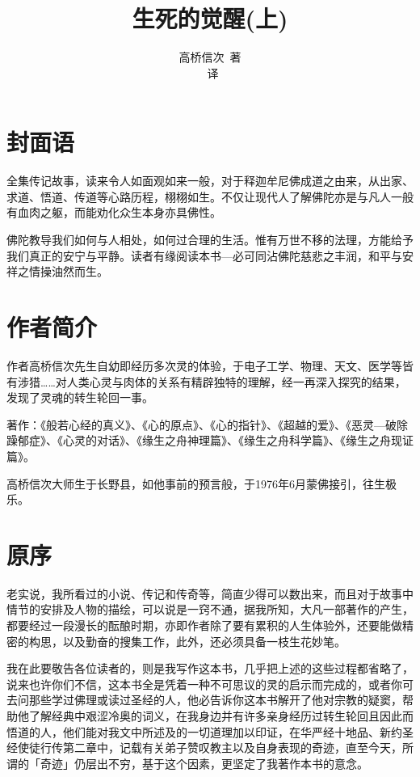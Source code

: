 \documentclass[12pt,twoside,openany]{book}
\title{生死的觉醒(上)}
\author{高桥信次\ 著\\ \xpinyin*{慰宣}\ 译}
\date{}
\begin{document}
\maketitle
\tableofcontents

\noindent
\chapter*{封面语}
全集传记故事，读来令人如面观如来一般，对于释迦牟尼佛成道之由来，从出家、求道、悟道、传道等心路历程，栩栩如生。不仅让现代人了解佛陀亦是与凡人一般有血肉之躯，而能劝化众生本身亦具佛性。

佛陀教导我们如何与人相处，如何过合理的生活。惟有万世不移的法理，方能给予我们真正的安宁与平静。读者有缘阅读本书---必可同沾佛陀慈悲之丰润，和平与安祥之情操油然而生。

\chapter*{作者简介}
作者高桥信次先生自幼即经历多次灵的体验，于电子工学、物理、天文、医学等皆有涉猎……对人类心灵与肉体的关系有精辟独特的理解，经一再深入探究的结果，发现了灵魂的转生轮回一事。

著作：《般若心经的真义》、《心的原点》、《心的指针》、《超越的爱》、《恶灵---破除躁郁症》、《心灵的对话》、《缘生之舟神理篇》、《缘生之舟科学篇》、《缘生之舟现证篇》。

高桥信次大师生于长野县，如他事前的预言般，于1976年6月蒙佛接引，往生极乐。

\chapter*{原序}
老实说，我所看过的小说、传记和传奇等，简直少得可以数出来，而且对于故事中情节的安排及人物的描绘，可以说是一窍不通，据我所知，大凡一部著作的产生，都要经过一段漫长的酝酿时期，亦即作者除了要有累积的人生体验外，还要能做精密的构思，以及勤奋的搜集工作，此外，还必须具备一枝生花妙笔。

我在此要敬告各位读者的，则是我写作这本书，几乎把上述的这些过程都省略了，说来也许你们不信，这本书全是凭着一种不可思议的灵的启示而完成的，或者你可去问那些学过佛理或读过圣经的人，他必告诉你这本书解开了他对宗教的疑窦，帮助他了解经典中艰涩冷奥的词义，在我身边并有许多亲身经历过转生轮回且因此而悟道的人，他们能对我文中所述及的一切道理加以印证，在华严经十地品、新约圣经使徒行传第二章中，记载有关弟子赞叹教主以及自身表现的奇迹，直至今天，所谓的「奇迹」仍层出不穷，基于这个因素，更坚定了我著作本书的意念。
\end{document}

